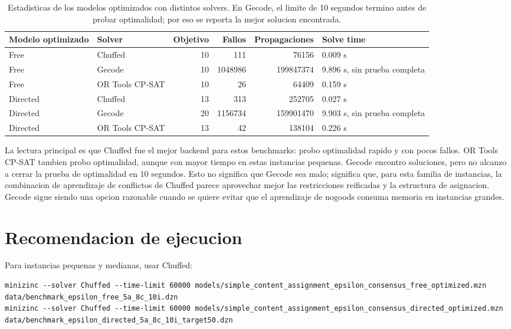 \documentclass[11pt,a4paper]{article}
\begin{document}
\begin{table}[h]
\centering
\scriptsize
\begin{tabular}{llrrrl}
\toprule
Modelo optimizado & Solver & Objetivo & Fallos & Propagaciones & Solve time \\
\midrule
Free & Chuffed & 10 & 111 & 76156 & 0.009 s \\
Free & Gecode & 10 & 1048986 & 199847374 & 9.896 s, sin prueba completa \\
Free & OR Tools CP-SAT & 10 & 26 & 64409 & 0.159 s \\
Directed & Chuffed & 13 & 313 & 252705 & 0.027 s \\
Directed & Gecode & 20 & 1156734 & 159901470 & 9.903 s, sin prueba completa \\
Directed & OR Tools CP-SAT & 13 & 42 & 138104 & 0.226 s \\
\bottomrule
\end{tabular}
\caption{Estadisticas de los modelos optimizados con distintos solvers. En Gecode, el limite de 10 segundos termino antes de probar optimalidad; por eso se reporta la mejor solucion encontrada.}
\end{table}

La lectura principal es que Chuffed fue el mejor backend para estos benchmarks: probo optimalidad rapido y con pocos fallos. OR Tools CP-SAT tambien probo optimalidad, aunque con mayor tiempo en estas instancias pequenas. Gecode encontro soluciones, pero no alcanzo a cerrar la prueba de optimalidad en 10 segundos. Esto no significa que Gecode sea malo; significa que, para esta familia de instancias, la combinacion de aprendizaje de conflictos de Chuffed parece aprovechar mejor las restricciones reificadas y la estructura de asignacion. Gecode sigue siendo una opcion razonable cuando se quiere evitar que el aprendizaje de nogoods consuma memoria en instancias grandes.

\section{Recomendacion de ejecucion}
Para instancias pequenas y medianas, usar Chuffed:
\begin{lstlisting}
minizinc --solver Chuffed --time-limit 60000 models/simple_content_assignment_epsilon_consensus_free_optimized.mzn data/benchmark_epsilon_free_5a_8c_10i.dzn
minizinc --solver Chuffed --time-limit 60000 models/simple_content_assignment_epsilon_consensus_directed_optimized.mzn data/benchmark_epsilon_directed_5a_8c_10i_target50.dzn
\end{lstlisting}
\end{document}
